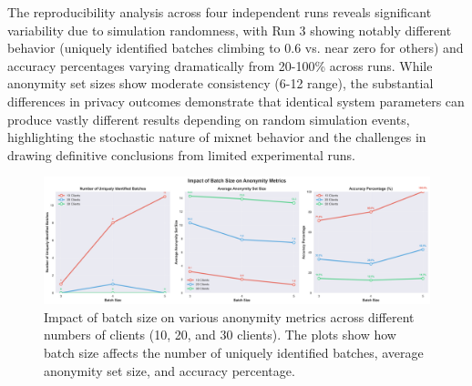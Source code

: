 \documentclass{article}
\begin{document}
The reproducibility analysis across four independent runs 
reveals significant variability due to simulation randomness, 
with Run 3 showing notably different behavior (uniquely 
identified batches climbing to 0.6 vs. near zero for others) 
and accuracy percentages varying dramatically from 20-100\% 
across runs. While anonymity set sizes show moderate 
consistency (6-12 range), the substantial differences 
in privacy outcomes demonstrate that identical system 
parameters can produce vastly different results depending 
on random simulation events, highlighting the stochastic 
nature of mixnet behavior and the challenges in drawing 
definitive conclusions from limited experimental runs.


\begin{figure}[!htb]
\centering
\includegraphics[width=\textwidth]{diagrams/batch_size_analysis_combined.png}
\caption{Impact of batch size on various anonymity metrics across 
different numbers of clients (10, 20, and 30 clients). 
The plots show how batch size affects the number of uniquely 
identified batches, average anonymity set size, and accuracy percentage.}
\label{fig:batchsize_analysis}
\end{figure}
\end{document}
